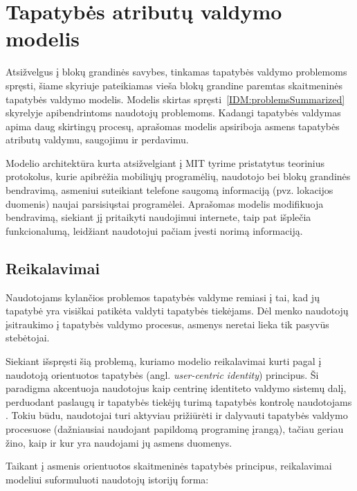 \section{Tapatybės atributų valdymo modelis} \label{section:BCIDM}

Atsižvelgus į blokų grandinės savybes, tinkamas tapatybės valdymo problemoms spręsti, šiame skyriuje pateikiamas
vieša blokų grandine paremtas skaitmeninės tapatybės valdymo modelis. Modelis skirtas spręsti\hypertarget{IDM:problemsSummarized}{~\ref{IDM:problemsSummarized}} skyrelyje
apibendrintoms naudotojų problemoms. Kadangi tapatybės valdymas apima
daug skirtingų procesų, aprašomas modelis apsiriboja asmens tapatybės atributų valdymu, saugojimu ir perdavimu.

Modelio architektūra kurta atsižvelgiant į MIT tyrime \cite{MITPaper} pristatytus teorinius protokolus, kurie apibrėžia
mobiliųjų programėlių, naudotojo bei blokų grandinės bendravimą, asmeniui suteikiant telefone saugomą
informaciją (pvz. lokacijos duomenis) naujai parsisiųstai programėlei. Aprašomas modelis modifikuoja bendravimą, siekiant 
jį pritaikyti naudojimui internete, taip pat išplečia funkcionalumą, leidžiant naudotojui pačiam įvesti norimą informaciją.

\subsection{Reikalavimai} \label{BCIDM:requirements}

Naudotojams kylančios problemos tapatybės valdyme remiasi į tai, kad jų tapatybė yra
visiškai patikėta valdyti tapatybės tiekėjams. Dėl menko naudotojų įsitraukimo į tapatybės valdymo
procesus, asmenys neretai lieka tik pasyvūs stebėtojai.

Siekiant išspręsti šią problemą, kuriamo modelio reikalavimai kurti pagal į naudotoją orientuotos tapatybės
(angl. \textit{user-centric identity}) principus. Ši paradigma akcentuoja naudotojus kaip centrinę
identiteto valdymo sistemų dalį, perduodant paslaugų ir tapatybės tiekėjų turimą tapatybės kontrolę
naudotojams \cite{Cao2010}. Tokiu būdu, naudotojai turi aktyviau prižiūrėti ir dalyvauti tapatybės
valdymo procesuose (dažniausiai naudojant papildomą programinę įrangą),
tačiau geriau žino, kaip ir kur yra naudojami jų asmens duomenys.

Taikant į asmenis orientuotos skaitmeninės tapatybės principus, reikalavimai modeliui suformuluoti naudotojų istorijų forma:

